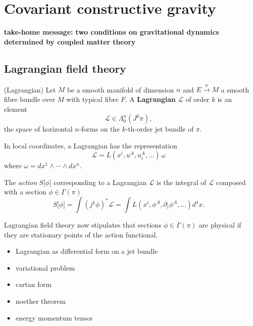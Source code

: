 \chapter{Covariant constructive gravity}

\textbf{take-home message: two conditions on gravitational dynamics determined by coupled matter theory}

\section{Lagrangian field theory}

\begin{definition}{(Lagrangian)}
  Let $M$ be a smooth manifold of dimension $n$ and $E \overset{\pi}{\longrightarrow} M$ a smooth fibre bundle over $M$ with typical fibre $F$. A \textbf{Lagrangian} $\mathcal L$ of order $k$ is an element
  \begin{equation}
    \mathcal L \in \Lambda^n_0(J^k\pi),
  \end{equation}
the space of horizontal $n$-forms on the $k$-th-order jet bundle of $\pi$.
\end{definition}

In local coordinates, a Lagrangian has the representation
\begin{equation}
  \mathcal L = L(x^i, u^A, u^A_i, \dots) \, \omega
\end{equation}
where $\omega = dx^1 \wedge \cdots \wedge dx^n$.

The \emph{action} $S\lbrack\phi\rbrack$ corresponding to a Lagrangian $\mathcal L$ is the integral of $\mathcal L$ composed with a section $\phi\in\Gamma(\pi)$
\begin{equation}
  S\lbrack\phi\rbrack = \int (j^k\phi)^\ast \mathcal L = \int L(x^i, \phi^A, \partial_i\phi^A, \dots) d^4x.
\end{equation}

Lagrangian field theory now stipulates that sections $\phi\in\Gamma(\pi)$ are physical if they are stationary points of the action functional.

\begin{itemize}
\item Lagrangian as differential form on a jet bundle
\item variational problem
\item cartan form
\item noether theorem
\item energy momentum tensor
\end{itemize}

